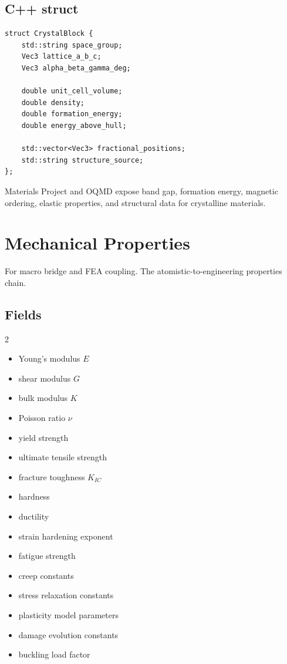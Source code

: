 \documentclass[11pt, a4paper]{article}
\begin{document}
\subsection{C++ struct}

\begin{lstlisting}
struct CrystalBlock {
    std::string space_group;
    Vec3 lattice_a_b_c;
    Vec3 alpha_beta_gamma_deg;

    double unit_cell_volume;
    double density;
    double formation_energy;
    double energy_above_hull;

    std::vector<Vec3> fractional_positions;
    std::string structure_source;
};
\end{lstlisting}

Materials Project and OQMD expose band gap, formation energy, magnetic ordering, elastic properties, and structural data for crystalline materials.

\section{Mechanical Properties}

For macro bridge and FEA coupling. The atomistic-to-engineering properties chain.

\subsection{Fields}

\begin{multicols}{2}
\begin{itemize}[itemsep=1pt, leftmargin=*]
  \item Young's modulus $E$
  \item shear modulus $G$
  \item bulk modulus $K$
  \item Poisson ratio $\nu$
  \item yield strength
  \item ultimate tensile strength
  \item fracture toughness $K_{IC}$
  \item hardness
  \item ductility
  \item strain hardening exponent
  \item fatigue strength
  \item creep constants
  \item stress relaxation constants
  \item plasticity model parameters
  \item damage evolution constants
  \item buckling load factor
\end{itemize}
\end{multicols}
\end{document}
